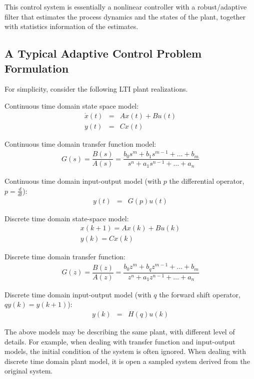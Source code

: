 This control system is essentially a nonlinear controller with a robust/adaptive filter that estimates the process dynamics and the states of the plant, together with statistics information of the estimates.

\subsection{A Typical Adaptive Control Problem Formulation}

For simplicity, consider the following LTI plant realizations.

Continuous time domain state space model:
\begin{eqnarray}
	\dot{x}(t) &=& Ax(t) + Bu(t) \nonumber \\
	y(t) &=& Cx(t) \nonumber
\end{eqnarray}

Continuous time domain transfer function model:
\begin{eqnarray}
	G(s) = \dfrac{B(s)}{A(s)} = \dfrac{b_0s^m + b_1s^{m-1} + \ldots + b_m}{s^n + a_1s^{n-1} + \ldots + a_n} \nonumber
\end{eqnarray}

Continuous time domain input-output model (with $p$ the differential operator, $p=\frac{d}{dt}$):
\begin{eqnarray}
	y(t) &=& G(p)u(t) \nonumber
\end{eqnarray}

Discrete time domain state-space model:
\begin{eqnarray}
	x(k+1) = Ax(k) + Bu(k) \nonumber \\
	y(k) = Cx(k) \nonumber
\end{eqnarray}

Discrete time domain transfer function:
\begin{eqnarray}
	G(z) = \dfrac{B(z)}{A(z)} = \dfrac{b_0z^m + b_qz^{m-1} + \ldots + b_m}{z^n + a_1z^{n-1} + \ldots + a_n} \nonumber
\end{eqnarray}

Discrete time domain input-output model (with $q$ the forward shift operator, $qy(k) = y(k+1)$):
\begin{eqnarray}
	y(k) &=& H(q)u(k) \nonumber
\end{eqnarray}

The above models may be describing the same plant, with different level of details. For example, when dealing with transfer function and input-output models, the initial condition of the system is often ignored. When dealing with discrete time domain plant model, it is open a sampled system derived from the original system.

